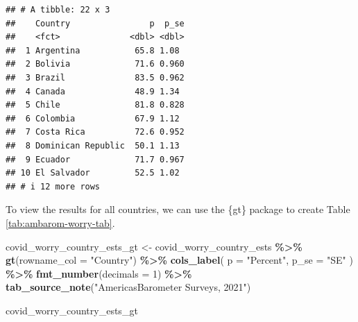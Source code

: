 \documentclass[
]{krantz}
\makeatletter
\newenvironment{Shaded}{\begin{snugshade}}{\end{snugshade}}
\newcommand{\AttributeTok}[1]{\textcolor[rgb]{0.27,0.27,0.27}{#1}}
\newcommand{\DecValTok}[1]{\textcolor[rgb]{0.06,0.06,0.06}{#1}}
\newcommand{\FunctionTok}[1]{\textcolor[rgb]{0.27,0.27,0.27}{\textbf{#1}}}
\newcommand{\NormalTok}[1]{#1}
\newcommand{\OtherTok}[1]{\textcolor[rgb]{0.37,0.37,0.37}{#1}}
\newcommand{\SpecialCharTok}[1]{\textcolor[rgb]{0.43,0.43,0.43}{\textbf{#1}}}
\newcommand{\StringTok}[1]{\textcolor[rgb]{0.5,0.5,0.5}{#1}}
\newenvironment{kframe}{%
\medskip{}
\setlength{\fboxsep}{.8em}
 \def\at@end@of@kframe{}%
 \ifinner\ifhmode%
  \def\at@end@of@kframe{\end{minipage}}%
  \begin{minipage}{\columnwidth}%
 \fi\fi%
 \def\FrameCommand##1{\hskip\@totalleftmargin \hskip-\fboxsep
 \colorbox{shadecolor}{##1}\hskip-\fboxsep
     \hskip-\linewidth \hskip-\@totalleftmargin \hskip\columnwidth}%
 \MakeFramed {\advance\hsize-\width
   \@totalleftmargin\z@ \linewidth\hsize
   \@setminipage}}%
 {\par\unskip\endMakeFramed%
 \at@end@of@kframe}
\renewenvironment{Shaded}{\begin{kframe}}{\end{kframe}}
\makeatother
\begin{document}
\begin{verbatim}
## # A tibble: 22 x 3
##    Country                p  p_se
##    <fct>              <dbl> <dbl>
##  1 Argentina           65.8 1.08 
##  2 Bolivia             71.6 0.960
##  3 Brazil              83.5 0.962
##  4 Canada              48.9 1.34 
##  5 Chile               81.8 0.828
##  6 Colombia            67.9 1.12 
##  7 Costa Rica          72.6 0.952
##  8 Dominican Republic  50.1 1.13 
##  9 Ecuador             71.7 0.967
## 10 El Salvador         52.5 1.02 
## # i 12 more rows
\end{verbatim}

To view the results for all countries, we can use the \{gt\} package to create Table \ref{tab:ambarom-worry-tab}.

\begin{Shaded}
\begin{Highlighting}[]
\NormalTok{covid\_worry\_country\_ests\_gt }\OtherTok{\textless{}{-}}\NormalTok{ covid\_worry\_country\_ests }\SpecialCharTok{\%\textgreater{}\%}
  \FunctionTok{gt}\NormalTok{(}\AttributeTok{rowname\_col =} \StringTok{"Country"}\NormalTok{) }\SpecialCharTok{\%\textgreater{}\%}
  \FunctionTok{cols\_label}\NormalTok{(}
    \AttributeTok{p =} \StringTok{"Percent"}\NormalTok{,}
    \AttributeTok{p\_se =} \StringTok{"SE"}
\NormalTok{  ) }\SpecialCharTok{\%\textgreater{}\%}
  \FunctionTok{fmt\_number}\NormalTok{(}\AttributeTok{decimals =} \DecValTok{1}\NormalTok{) }\SpecialCharTok{\%\textgreater{}\%}
  \FunctionTok{tab\_source\_note}\NormalTok{(}\StringTok{"AmericasBarometer Surveys, 2021"}\NormalTok{)}
\end{Highlighting}
\end{Shaded}

\begin{Shaded}
\begin{Highlighting}[]
\NormalTok{covid\_worry\_country\_ests\_gt}
\end{Highlighting}
\end{Shaded}
\end{document}
